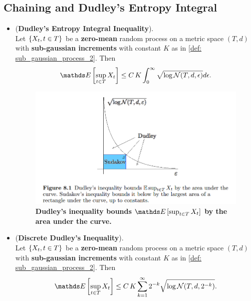 \documentclass[11pt]{article}
\begin{document}
\subsection{Chaining and Dudley's Entropy Integral}
\begin{itemize}
\item \begin{theorem} (\textbf{Dudley's Entropy Integral Inequality}). \citep{vershynin2018high}\\
Let $\left\{X_{t}, t \in T\right\}$ be a \textbf{zero-mean} random process on a metric space $(T, d)$ with \textbf{sub-gaussian increments} with constant $K$ as in \eqref{def: sub_gaussian_process_2}.
Then
\begin{align}
\E{}{\sup_{t\in T}X_t } \le C\,K\int_{0}^{\infty} \sqrt{\log \cN(T, d, \epsilon)} d\epsilon. \label{ineqn: dudley_metric_entropy_integral_inequality_exp_sup_norm}
\end{align}
\end{theorem}

\begin{figure}
\begin{minipage}[t]{1\linewidth}
  \centering
  \centerline{\includegraphics[scale = 0.45]{dudley_inequality.png}}
\end{minipage}
\caption{\footnotesize{\textbf{Dudley's inequality bounds $\E{}{\sup_{t\in T}X_t }$ by the area under the curve.   \citep{vershynin2018high}}}}
\label{fig: dudley_inequality}
\end{figure}


\item \begin{theorem} (\textbf{Discrete Dudley's Inequality}). \citep{vershynin2018high}\\
Let $\left\{X_{t}, t \in T\right\}$ be a \textbf{zero-mean} random process on a metric space $(T, d)$ with \textbf{sub-gaussian increments} with constant $K$ as in \eqref{def: sub_gaussian_process_2}.
Then
\begin{align}
\E{}{\sup_{t\in T}X_t } \le C\,K \sum_{k=1}^{\infty}2^{-k}\sqrt{\log \cN(T, d, 2^{-k})}. \label{ineqn: dudley_metric_entropy_integral_inequality_discrete}
\end{align}
\end{theorem}


\end{itemize}
\end{document}
